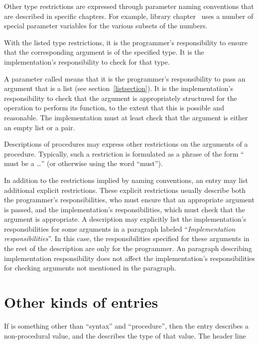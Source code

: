 Other type restrictions are expressed through parameter naming
conventions that are described in specific chapters.  For example,
library chapter~ uses a number of special
parameter variables for the various subsets of the numbers.

With the listed type restrictions, it is the programmer's responsibility to
ensure that the corresponding argument is of the specified type.
It is the implementation's responsibility to check for
that type.

A parameter called  means that it is the
programmer's responsibility to pass an argument that is a list (see
section~\ref{listsection}).  It is the implementation's responsibility
to check that the argument is appropriately structured for the
operation to perform its function, to the extent that this is possible
and reasonable.  The implementation must at least check that the
argument is either an empty list or a pair.

Descriptions of procedures may express other restrictions on the
arguments of a procedure.  Typically, such a restriction is formulated
as a phrase of the form `` must be a \ldots'' (or otherwise
using the word ``must'').

In addition to the restrictions implied by naming conventions, an
entry may list additional explicit restrictions.
These explicit restrictions usually describe both the
programmer's responsibilities, who must ensure that an appropriate
argument is passed, and the implementation's responsibilities, which
must check that the argument is appropriate.  A description
may explicitly list the implementation's responsibilities for some
arguments in a paragraph labeled ``\textit{Implementation
  responsibilities}''.  In this case, the responsibilities specified
for these arguments in the rest of the description are only for the
programmer.  An paragraph describing implementation responsibility does not
affect the implementation's responsibilities for checking arguments not
mentioned in the paragraph.

\section{Other kinds of entries}

If  is something other than ``syntax'' and
``procedure'', then the entry describes a non-procedural value, and
the  describes the type of that value.  The header line

